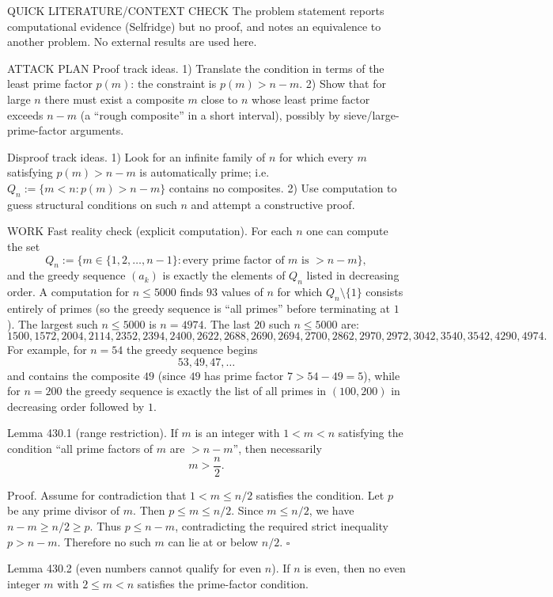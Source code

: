 QUICK LITERATURE/CONTEXT CHECK
The problem statement reports computational evidence (Selfridge) but no proof, and notes an equivalence to another problem. No external results are used here.

ATTACK PLAN
Proof track ideas.
1) Translate the condition in terms of the least prime factor $p(m)$: the constraint is $p(m)>n-m$.
2) Show that for large $n$ there must exist a composite $m$ close to $n$ whose least prime factor exceeds $n-m$ (a “rough composite” in a short interval), possibly by sieve/large-prime-factor arguments.

Disproof track ideas.
1) Look for an infinite family of $n$ for which every $m$ satisfying $p(m)>n-m$ is automatically prime; i.e. $Q_n:=\{m<n: p(m)>n-m\}$ contains no composites.
2) Use computation to guess structural conditions on such $n$ and attempt a constructive proof.

WORK
Fast reality check (explicit computation).
For each $n$ one can compute the set
\[
Q_n:=\{m\in\{1,2,\dots,n-1\}: \text{every prime factor of }m\text{ is } > n-m\},
\]
and the greedy sequence $(a_k)$ is exactly the elements of $Q_n$ listed in decreasing order.
A computation for $n\le 5000$ finds $93$ values of $n$ for which $Q_n\setminus\{1\}$ consists entirely of primes (so the greedy sequence is “all primes” before terminating at $1$).
The largest such $n\le 5000$ is $n=4974$.
The last $20$ such $n\le 5000$ are:
\[
1500,1572,2004,2114,2352,2394,2400,2622,2688,2690,2694,2700,2862,2970,2972,3042,3540,3542,4290,4974.
\]
For example, for $n=54$ the greedy sequence begins
\[
53,49,47,\dots
\]
and contains the composite $49$ (since $49$ has prime factor $7>54-49=5$), while for $n=200$ the greedy sequence is exactly the list of all primes in $(100,200)$ in decreasing order followed by $1$.

Lemma 430.1 (range restriction).
If $m$ is an integer with $1<m<n$ satisfying the condition “all prime factors of $m$ are $>n-m$”, then necessarily
\[
 m>\frac n2.
\]

Proof.
Assume for contradiction that $1<m\le n/2$ satisfies the condition.
Let $p$ be any prime divisor of $m$. Then $p\le m\le n/2$.
Since $m\le n/2$, we have $n-m\ge n/2\ge p$.
Thus $p\le n-m$, contradicting the required strict inequality $p>n-m$.
Therefore no such $m$ can lie at or below $n/2$.
\hfill $\square$

Lemma 430.2 (even numbers cannot qualify for even $n$).
If $n$ is even, then no even integer $m$ with $2\le m<n$ satisfies the prime-factor condition.


